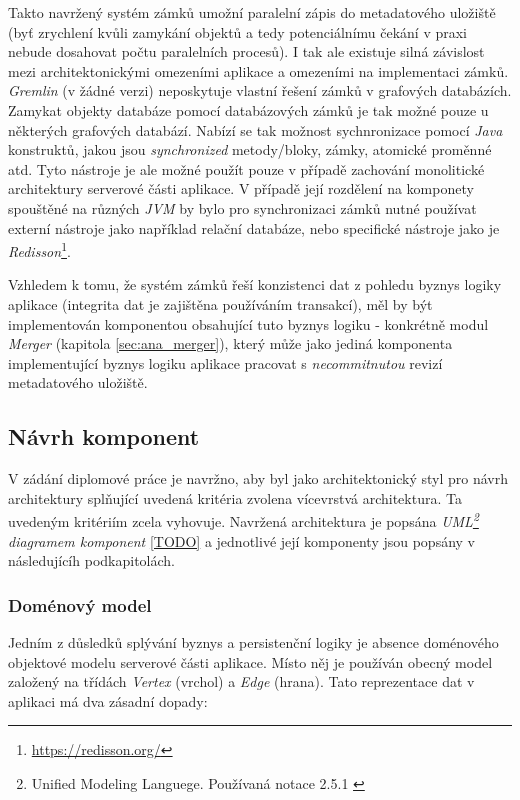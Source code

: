 Takto navržený systém zámků umožní paralelní zápis do metadatového uložiště (byť zrychlení kvůli zamykání objektů a tedy potenciálnímu čekání v praxi nebude dosahovat počtu paralelních procesů). I tak ale existuje silná závislost mezi architektonickými omezeními aplikace a omezeními na implementaci zámků. \textit{Gremlin} (v žádné verzi) neposkytuje vlastní řešení zámků v grafových databázích. Zamykat objekty databáze pomocí databázových zámků je tak možné pouze u některých grafových databází. Nabízí se tak možnost sychnronizace pomocí \textit{Java} konstruktů, jakou jsou \textit{synchronized} metody/bloky, zámky, atomické proměnné atd. Tyto nástroje je ale možné použít pouze v případě zachování monolitické architektury serverové části aplikace. V případě její rozdělení na  komponety spouštěné na různých \textit{JVM} by bylo pro synchronizaci zámků nutné používat externí nástroje jako například relační databáze, nebo specifické nástroje jako je \textit{Redisson}\footnote{\url{https://redisson.org/}}.

Vzhledem k tomu, že systém zámků řeší konzistenci dat z pohledu byznys logiky aplikace (integrita dat je zajištěna používáním transakcí), měl by být implementován komponentou obsahující tuto byznys logiku - konkrétně modul \textit{Merger} (kapitola \ref{sec:ana_merger}), který může jako jediná komponenta implementující byznys logiku aplikace pracovat s \textit{necommitnutou} revizí metadatového uložiště.

\subsection{Návrh komponent}
\label{sec:des_components}
V zádání diplomové práce je navržno, aby byl jako architektonický styl pro návrh architektury splňující uvedená kritéria zvolena vícevrstvá architektura. Ta uvedeným kritériím zcela vyhovuje. Navržená architektura je popsána \textit{UML\footnote{Unified Modeling Languege. Používaná notace 2.5.1 \cite{UML17}} diagramem komponent} \ref{TODO} a jednotlivé její komponenty jsou popsány v následujícíh podkapitolách.

\subsubsection{Doménový model}
\label{sec:des_domain}
Jedním z důsledků splývání byznys a persistenční logiky je absence doménového objektové modelu serverové části aplikace. Místo něj je používán obecný model založený na třídách \textit{Vertex} (vrchol) a \textit{Edge} (hrana). Tato reprezentace dat v aplikaci má dva zásadní dopady:

